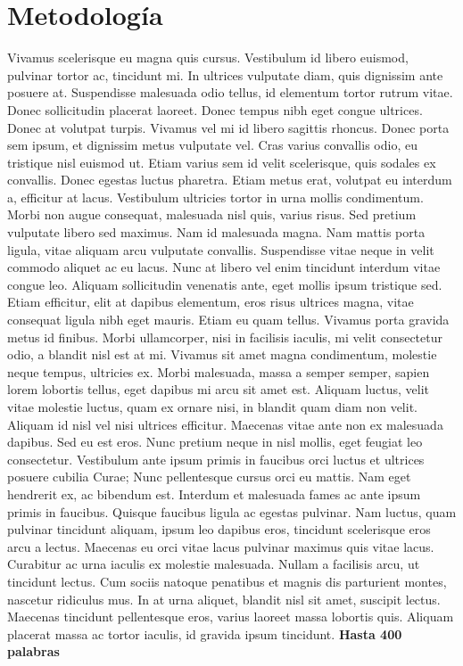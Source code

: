 \section{Metodología}
%
Vivamus scelerisque eu magna quis cursus. Vestibulum id libero euismod, pulvinar tortor ac, tincidunt mi. In ultrices vulputate diam, quis dignissim ante posuere at. Suspendisse malesuada odio tellus, id elementum tortor rutrum vitae. Donec sollicitudin placerat laoreet. Donec tempus nibh eget congue ultrices. Donec at volutpat turpis. Vivamus vel mi id libero sagittis rhoncus. Donec porta sem ipsum, et dignissim metus vulputate vel. Cras varius convallis odio, eu tristique nisl euismod ut. Etiam varius sem id velit scelerisque, quis sodales ex convallis. Donec egestas luctus pharetra. Etiam metus erat, volutpat eu interdum a, efficitur at lacus. Vestibulum ultricies tortor in urna mollis condimentum. Morbi non augue consequat, malesuada nisl quis, varius risus. Sed pretium vulputate libero sed maximus.
Nam id malesuada magna. Nam mattis porta ligula, vitae aliquam arcu vulputate convallis. Suspendisse vitae neque in velit commodo aliquet ac eu lacus. Nunc at libero vel enim tincidunt interdum vitae congue leo. Aliquam sollicitudin venenatis ante, eget mollis ipsum tristique sed. Etiam efficitur, elit at dapibus elementum, eros risus ultrices magna, vitae consequat ligula nibh eget mauris. Etiam eu quam tellus. Vivamus porta gravida metus id finibus. Morbi ullamcorper, nisi in facilisis iaculis, mi velit consectetur odio, a blandit nisl est at mi. Vivamus sit amet magna condimentum, molestie neque tempus, ultricies ex. Morbi malesuada, massa a semper semper, sapien lorem lobortis tellus, eget dapibus mi arcu sit amet est. Aliquam luctus, velit vitae molestie luctus, quam ex ornare nisi, in blandit quam diam non velit. Aliquam id nisl vel nisi ultrices efficitur. Maecenas vitae ante non ex malesuada dapibus. Sed eu est eros.
Nunc pretium neque in nisl mollis, eget feugiat leo consectetur. Vestibulum ante ipsum primis in faucibus orci luctus et ultrices posuere cubilia Curae; Nunc pellentesque cursus orci eu mattis. Nam eget hendrerit ex, ac bibendum est. Interdum et malesuada fames ac ante ipsum primis in faucibus. Quisque faucibus ligula ac egestas pulvinar. Nam luctus, quam pulvinar tincidunt aliquam, ipsum leo dapibus eros, tincidunt scelerisque eros arcu a lectus. Maecenas eu orci vitae lacus pulvinar maximus quis vitae lacus.
Curabitur ac urna iaculis ex molestie malesuada. Nullam a facilisis arcu, ut tincidunt lectus. Cum sociis natoque penatibus et magnis dis parturient montes, nascetur ridiculus mus. In at urna aliquet, blandit nisl sit amet, suscipit lectus. Maecenas tincidunt pellentesque eros, varius laoreet massa lobortis quis. Aliquam placerat massa ac tortor iaculis, id gravida ipsum tincidunt. {\bf \Large Hasta 400 palabras}